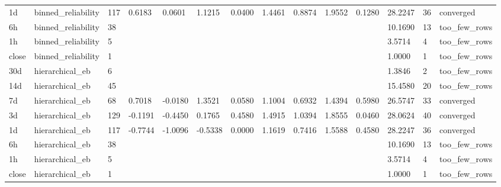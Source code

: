 \begin{tabular}{llllllllllllll}
1d & binned\_reliability & 117 & 0.6183 & 0.0601 & 1.1215 & 0.0400 & 1.4461 & 0.8874 & 1.9552 & 0.1280 & 28.2247 & 36 & converged \\
6h & binned\_reliability & 38 &  &  &  &  &  &  &  &  & 10.1690 & 13 & too\_few\_rows \\
1h & binned\_reliability & 5 &  &  &  &  &  &  &  &  & 3.5714 & 4 & too\_few\_rows \\
close & binned\_reliability & 1 &  &  &  &  &  &  &  &  & 1.0000 & 1 & too\_few\_rows \\
30d & hierarchical\_eb & 6 &  &  &  &  &  &  &  &  & 1.3846 & 2 & too\_few\_rows \\
14d & hierarchical\_eb & 45 &  &  &  &  &  &  &  &  & 15.4580 & 20 & too\_few\_rows \\
7d & hierarchical\_eb & 68 & 0.7018 & -0.0180 & 1.3521 & 0.0580 & 1.1004 & 0.6932 & 1.4394 & 0.5980 & 26.5747 & 33 & converged \\
3d & hierarchical\_eb & 129 & -0.1191 & -0.4450 & 0.1765 & 0.4580 & 1.4915 & 1.0394 & 1.8555 & 0.0460 & 28.0624 & 40 & converged \\
1d & hierarchical\_eb & 117 & -0.7744 & -1.0096 & -0.5338 & 0.0000 & 1.1619 & 0.7416 & 1.5588 & 0.4580 & 28.2247 & 36 & converged \\
6h & hierarchical\_eb & 38 &  &  &  &  &  &  &  &  & 10.1690 & 13 & too\_few\_rows \\
1h & hierarchical\_eb & 5 &  &  &  &  &  &  &  &  & 3.5714 & 4 & too\_few\_rows \\
close & hierarchical\_eb & 1 &  &  &  &  &  &  &  &  & 1.0000 & 1 & too\_few\_rows \\
\bottomrule
\end{tabular}
